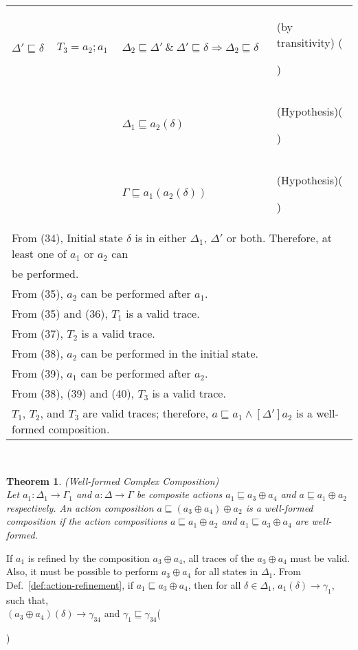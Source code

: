 \documentclass[12pt,journal,letterpaper,onecolumn]{IEEEtran}
\newcounter{myCounter}
\renewcommand{\themyCounter}{\arabic{myCounter}\addtocounter{myCounter}{1}}
\newtheorem{theorem}{Theorem}[section]
\begin{document}
\begin{minipage}{6in}
\begin{center}
\begin{tabular}{llp{6.3cm}p{3.8cm}}
$\Delta' \sqsubseteq \delta$& $T_3 = a_2;a_1$ & $\Delta_2 \sqsubseteq \Delta' ~\&~ \Delta' \sqsubseteq \delta \Rightarrow \Delta_2 \sqsubseteq \delta$ & (by transitivity) \hfill(\themyCounter) \\
& & $\Delta_1 \sqsubseteq a_2(\delta)$ & (Hypothesis)\hfill(\themyCounter)\\
& & $\Gamma \sqsubseteq a_1(a_2(\delta))$ & (Hypothesis)\hfill(\themyCounter)\\
\multicolumn{4}{l}{From (34), Initial state $\delta$ is in either $\Delta_1$, $\Delta'$ or both. Therefore, at least one of $a_1$ or $a_2$ can}\\
\multicolumn{4}{l}{be performed.}\\
\multicolumn{4}{l}{From (35), $a_2$ can be performed after $a_1$.}\\
\multicolumn{4}{l}{From (35) and (36), $T_1$ is a valid trace.}\\
\multicolumn{4}{l}{From (37), $T_2$ is a valid trace.}\\
\multicolumn{4}{l}{From (38), $a_2$ can be performed in the initial state.}\\
\multicolumn{4}{l}{From (39), $a_1$ can be performed after $a_2$.}\\
\multicolumn{4}{l}{From (38), (39) and (40), $T_3$ is a valid trace.}\\
\multicolumn{4}{l}{$T_1$, $T_2$, and $T_3$ are valid traces;
therefore, $a\sqsubseteq a_1\wedge[\Delta']a_2$ is a well-formed
composition.}\hfill$\Box$
\end{tabular}
\end{center}
\end{minipage}\\


\begin{theorem}(Well-formed Complex Composition)\\
Let $a_1:\Delta_1\rightarrow\Gamma_1$ and
$a:\Delta\rightarrow\Gamma$ be composite actions $a_1 \sqsubseteq
a_3 \oplus a_4$ and $a \sqsubseteq a_1 \oplus a_2$ respectively. An
action composition $a \sqsubseteq (a_3 \oplus a_4) \oplus a_2$ is a
well-formed composition if the action compositions $a \sqsubseteq
a_1 \oplus a_2$ and $a_1 \sqsubseteq a_3 \oplus a_4$ are
well-formed.
 \label{thm:complexcomposition}
\end{theorem}
{} If $a_1$ is refined by the composition
$a_3\oplus a_4$, all traces of the $a_3\oplus a_4$ must be valid.
Also, it must be possible to perform $a_3 \oplus a_4$ for all states
in $\Delta_1$. From Def.~\ref{def:action-refinement}, if
$a_1\sqsubseteq a_3\oplus a_4$, then for all $\delta \in \Delta_1$,
$a_1(\delta)\rightarrow \gamma_1$, such that, \\
\indent $(a_3\oplus a_4)(\delta)\rightarrow \gamma_{34}$ and $\gamma_1 \sqsubseteq\gamma_{34}$\hfill({\themyCounter)}\\
\end{document}
